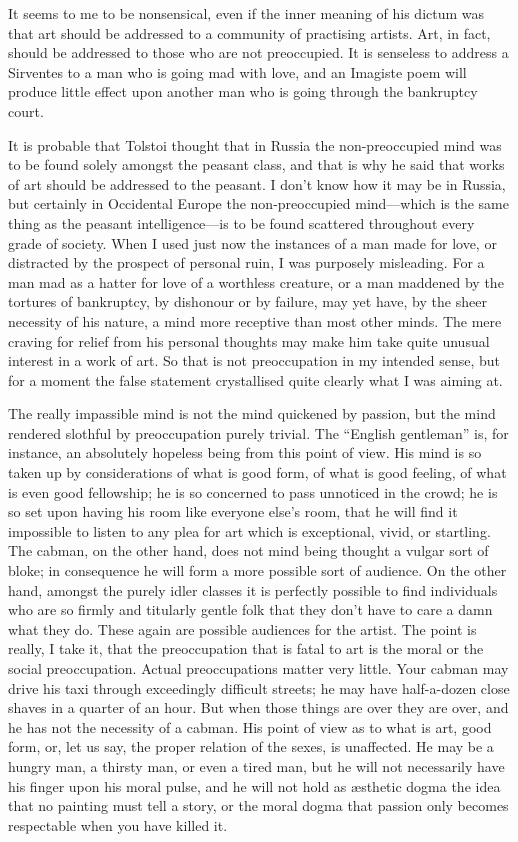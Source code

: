 It seems to me to be nonsensical, even if the inner meaning of his
dictum was that art should be addressed to a community of practising
artists. Art, in fact, should be addressed to those who are not
preoccupied. It is senseless to address a Sirventes to a man who is
going mad with love, and an Imagiste poem will produce little effect
upon another man who is going through the bankruptcy court.

It is probable that Tolstoi thought that in Russia the non-preoccupied
mind was to be found solely amongst the peasant class, and that is why
he said that works of art should be addressed to the peasant. I don't
know how it may be in Russia, but certainly in Occidental Europe the
non-preoccupied mind---which is the same thing as the peasant
intelligence---is to be found scattered throughout every grade of
society. When I used just now the instances of a man made for love, or
distracted by the prospect of personal ruin, I was purposely misleading.
For a man mad as a hatter for love of a worthless creature, or a man
maddened by the tortures of bankruptcy, by dishonour or by failure, may
yet have, by the sheer necessity of his nature, a mind more receptive
than most other minds. The mere craving for relief from his personal
thoughts may make him take quite unusual interest in a work of art. So
that is not preoccupation in my intended sense, but for a moment the
false statement crystallised quite clearly what I was aiming at.

The really impassible mind is not the mind quickened by passion, but the
mind rendered slothful by preoccupation purely trivial. The ``English
gentleman'' is, for instance, an absolutely hopeless being from this
point of view. His mind is so taken up by considerations of what is good
form, of what is good feeling, of what is even good fellowship; he is so
concerned to pass unnoticed in the crowd; he is so set upon having his
room like everyone else's room, that he will find it impossible to
listen to any plea for art which is exceptional, vivid, or startling.
The cabman, on the other hand, does not mind being thought a vulgar sort
of bloke; in consequence he will form a more possible sort of audience.
On the other hand, amongst the purely idler classes it is perfectly
possible to find individuals who are so firmly and titularly gentle folk
that they don't have to care a damn what they do. These again are
possible audiences for the artist. The point is really, I take it, that
the preoccupation that is fatal to art is the moral or the social
preoccupation. Actual preoccupations matter very little. Your cabman may
drive his taxi through exceedingly difficult streets; he may have
half-a-dozen close shaves in a quarter of an hour. But when those things
are over they are over, and he has not the necessity of a cabman. His
point of view as to what is art, good form, or, let us say, the proper
relation of the sexes, is unaffected. He may be a hungry man, a thirsty
man, or even a tired man, but he will not necessarily have his finger
upon his moral pulse, and he will not hold as æsthetic dogma the idea
that no painting must tell a story, or the moral dogma that passion only
becomes respectable when you have killed it.

